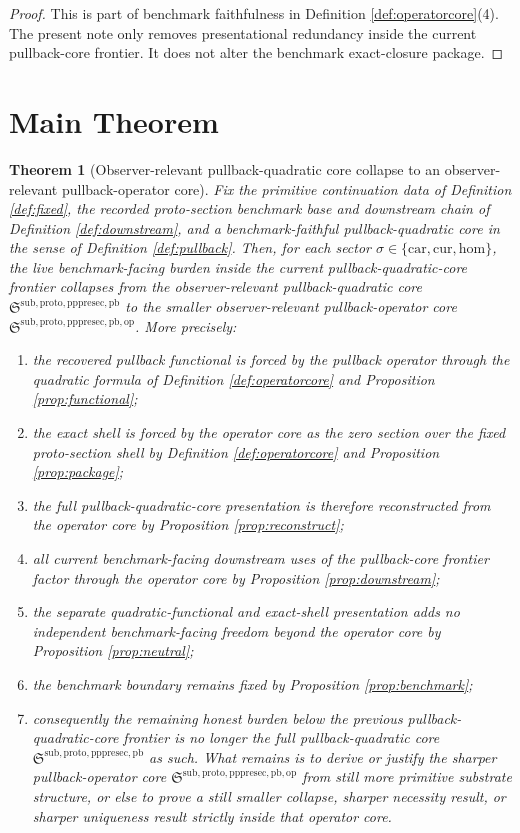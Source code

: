 \documentclass[11pt]{article}
\newcommand{\Car}{\mathrm{car}}
\newcommand{\Cur}{\mathrm{cur}}
\newcommand{\Hom}{\mathrm{hom}}
\newcommand{\PrePreProtoSectionPullbackCore}{\mathfrak S^{\mathrm{sub,proto,pppresec,pb}}}
\newcommand{\PullbackOperatorCore}{\mathfrak S^{\mathrm{sub,proto,pppresec,pb,op}}}
\newtheorem{theorem}{Theorem}
\begin{document}
\begin{proof}
This is part of benchmark faithfulness in Definition \ref{def:operatorcore}(4). The present note only removes presentational redundancy inside the current pullback-core frontier. It does not alter the benchmark exact-closure package.
\end{proof}

\section{Main Theorem}

\begin{theorem}[Observer-relevant pullback-quadratic core collapse to an observer-relevant pullback-operator core]
\label{thm:main}
Fix the primitive continuation data of Definition \ref{def:fixed}, the recorded proto-section benchmark base and downstream chain of Definition \ref{def:downstream}, and a benchmark-faithful pullback-quadratic core in the sense of Definition \ref{def:pullback}. Then, for each sector \(\sigma\in\{\Car,\Cur,\Hom\}\), the live benchmark-facing burden inside the current pullback-quadratic-core frontier collapses from the observer-relevant pullback-quadratic core \(\PrePreProtoSectionPullbackCore\) to the smaller observer-relevant pullback-operator core \(\PullbackOperatorCore\). More precisely:
\begin{enumerate}
    \item the recovered pullback functional is forced by the pullback operator through the quadratic formula of Definition \ref{def:operatorcore} and Proposition \ref{prop:functional};
    \item the exact shell is forced by the operator core as the zero section over the fixed proto-section shell by Definition \ref{def:operatorcore} and Proposition \ref{prop:package};
    \item the full pullback-quadratic-core presentation is therefore reconstructed from the operator core by Proposition \ref{prop:reconstruct};
    \item all current benchmark-facing downstream uses of the pullback-core frontier factor through the operator core by Proposition \ref{prop:downstream};
    \item the separate quadratic-functional and exact-shell presentation adds no independent benchmark-facing freedom beyond the operator core by Proposition \ref{prop:neutral};
    \item the benchmark boundary remains fixed by Proposition \ref{prop:benchmark};
    \item consequently the remaining honest burden below the previous pullback-quadratic-core frontier is no longer the full pullback-quadratic core \(\PrePreProtoSectionPullbackCore\) as such. What remains is to derive or justify the sharper pullback-operator core \(\PullbackOperatorCore\) from still more primitive substrate structure, or else to prove a still smaller collapse, sharper necessity result, or sharper uniqueness result strictly inside that operator core.
\end{enumerate}
\end{theorem}
\end{document}
